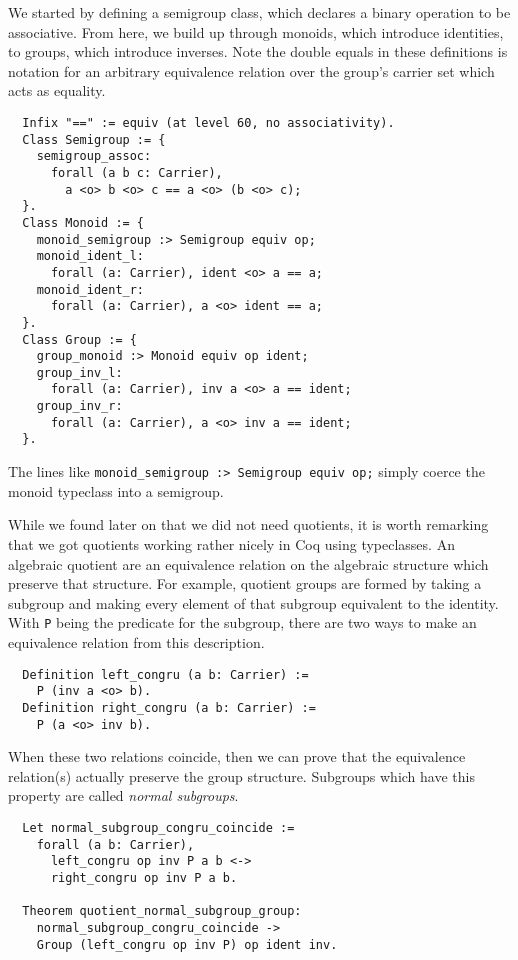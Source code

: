 \documentclass{article}
\begin{document}
We started by defining a semigroup class, which declares a binary operation to
be associative. From here, we build up through monoids, which introduce
identities, to groups, which introduce inverses. Note the double equals in
these definitions is notation for an arbitrary equivalence relation over the
group's carrier set which acts as equality.
\begin{verbatim}
  Infix "==" := equiv (at level 60, no associativity).
  Class Semigroup := {
    semigroup_assoc:
      forall (a b c: Carrier),
        a <o> b <o> c == a <o> (b <o> c);
  }.
  Class Monoid := {
    monoid_semigroup :> Semigroup equiv op;
    monoid_ident_l:
      forall (a: Carrier), ident <o> a == a;
    monoid_ident_r:
      forall (a: Carrier), a <o> ident == a;
  }.
  Class Group := {
    group_monoid :> Monoid equiv op ident;
    group_inv_l:
      forall (a: Carrier), inv a <o> a == ident;
    group_inv_r:
      forall (a: Carrier), a <o> inv a == ident;
  }.
\end{verbatim}
The lines like \verb|monoid_semigroup :> Semigroup equiv op;| simply coerce
the monoid typeclass into a semigroup.

While we found later on that we did not need quotients, it is worth remarking
that we got quotients working rather nicely in Coq using typeclasses. An
algebraic quotient are an equivalence relation on the algebraic structure which
preserve that structure. For example, quotient groups are formed by taking a
subgroup and making every element of that subgroup equivalent to the identity.
With \texttt{P} being the predicate for the subgroup, there are two ways to
make an equivalence relation from this description.
\begin{verbatim}
  Definition left_congru (a b: Carrier) :=
    P (inv a <o> b).
  Definition right_congru (a b: Carrier) :=
    P (a <o> inv b).
\end{verbatim}
When these two relations coincide, then we can prove that the equivalence
relation(s) actually preserve the group structure. Subgroups which have this
property are called \emph{normal subgroups}.
\begin{verbatim}
  Let normal_subgroup_congru_coincide :=
    forall (a b: Carrier),
      left_congru op inv P a b <->
      right_congru op inv P a b.

  Theorem quotient_normal_subgroup_group:
    normal_subgroup_congru_coincide ->
    Group (left_congru op inv P) op ident inv.
\end{verbatim}
\end{document}
